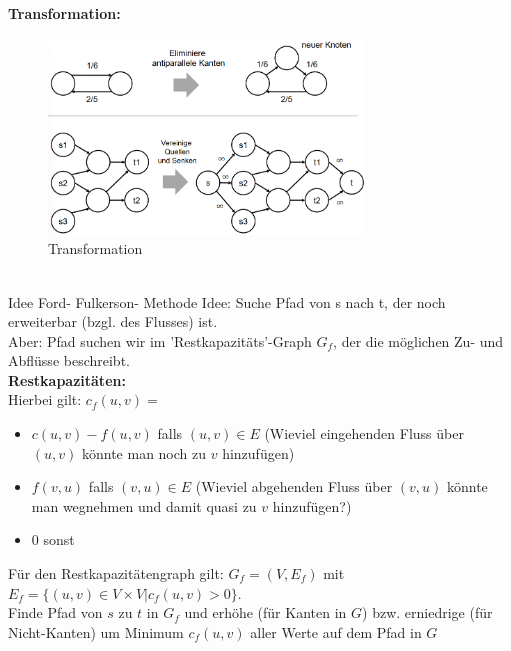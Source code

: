 \documentclass{article}
\begin{document}
            \textbf{Transformation:}\\
            \begin{figure}[ht]
                \centering
                \includegraphics[width=0.75\textwidth]{Bilder/NWTrans.png}
                \caption{Transformation}
                \label{fig:NWTrans}
            \end{figure}\\
            Idee Ford- Fulkerson- Methode Idee: Suche Pfad von s nach t, der noch erweiterbar (bzgl. des Flusses) ist.\\
            Aber: Pfad suchen wir im 'Restkapazitäts'-Graph $G_f$, der die möglichen Zu- und Abflüsse beschreibt.\\
            \textbf{Restkapazitäten:}\\ Hierbei gilt: $c_f(u,v)=$
            \begin{itemize}
                \item $c(u,v)-f(u,v)$ falls $(u,v)\in E$ (Wieviel eingehenden Fluss über $(u,v)$ könnte man noch zu $v$ hinzufügen)
                \item $f(v,u)$ falls $(v,u)\in E$ (Wieviel abgehenden Fluss über $(v,u)$ könnte man wegnehmen und damit quasi zu $v$ hinzufügen?)
                \item $0$ sonst
            \end{itemize}
            Für den Restkapazitätengraph gilt: $G_f=(V,E_f)$ mit $E_f=\{(u,v)\in V\times V|c_f(u,v) > 0\}$.\\
            Finde Pfad von $s$ zu $t$ in $G_f$ und erhöhe (für Kanten in $G$) bzw. erniedrige (für Nicht-Kanten) um Minimum $c_f(u,v)$ aller Werte auf dem Pfad in $G$
\end{document}

